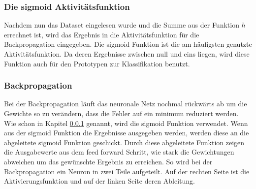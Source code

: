 \subsubsection{Die sigmoid Aktivitätsfunktion}
\label{sec:inp}
Nachdem nun das Dataset eingelesen wurde und die Summe aus der Funktion \(h\) errechnet ist, wird das Ergebnis in die Aktivitätsfunktion für die Backpropagation eingegeben. Die sigmoid Funktion ist die am häufigsten genutzte Aktivitätsfunktion. Da deren Ergebnisse zwischen null und eins liegen, wird diese Funktion auch für den Prototypen zur Klassifikation benutzt. \citep{Rey2011} 


\subsubsection{Backpropagation}
Bei der Backpropagation läuft das neuronale Netz nochmal rückwärts ab um die Gewichte so zu verändern, dass die Fehler auf ein minimum reduziert werden. Wie schon in Kapitel \ref{sec:inp} genannt, wird die sigmoid Funktion verwendet. Wenn aus der sigmoid Funktion die Ergebnisse ausgegeben werden, werden diese an die abgeleitete sigmoid Funktion geschickt. Durch diese abgeleitete Funktion zeigen die Ausgabewerte aus dem feed forward Schritt, wie stark die Gewichtungen abweichen um das gewünschte Ergebnis zu erreichen.
\newline
So wird bei der Backpropagation ein Neuron in zwei Teile aufgeteilt. Auf der rechten Seite ist die Aktivierungsfunktion und auf der linken Seite deren Ableitung. 

